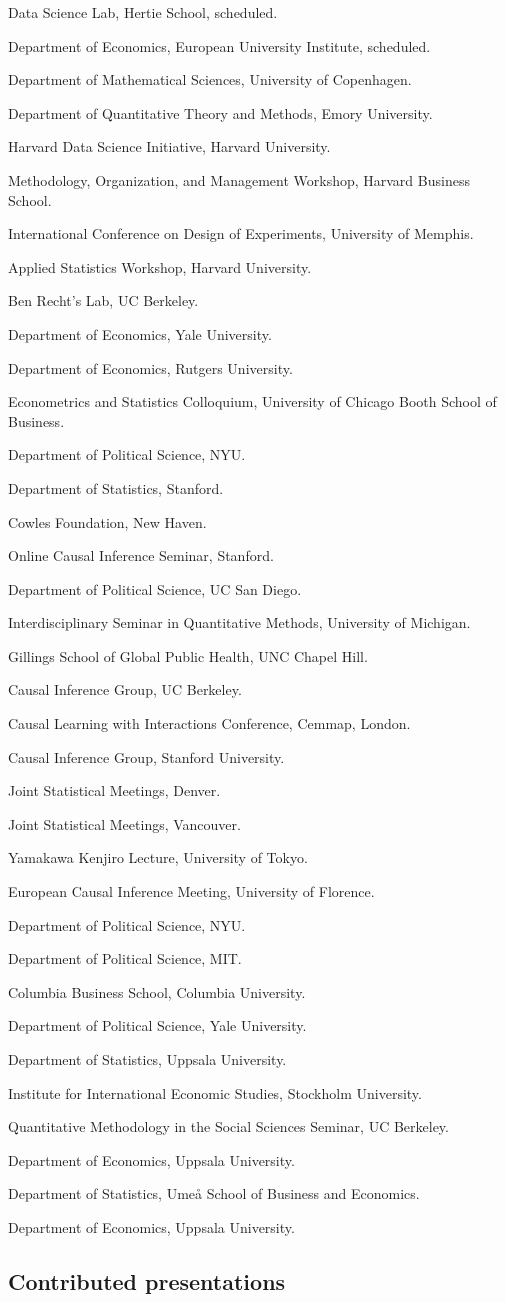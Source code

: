 \documentclass[10pt,letterpaper]{article}
\newenvironment{singledatelist}{
	\begin{list}{}{
		\setlength{\parskip}{0pt}
		\setlength{\itemsep}{4pt}
		\setlength{\parsep}{0.3em}
		\setlength{\leftmargin}{3.5em}
		\setlength{\labelwidth}{3.5em}
		\setlength{\labelsep}{1.5em}
		}
	}{
\end{list}
}
\newcommand{\dateitem}[2][]{\item[{#1}] {#2}}
\begin{document}
	\begin{singledatelist}
		\dateitem[2024]{Data Science Lab, Hertie School, scheduled.}
		\dateitem{Department of Economics, European University Institute, scheduled.}
		\dateitem{Department of Mathematical Sciences, University of Copenhagen.}
		\dateitem{Department of Quantitative Theory and Methods, Emory University.}
		\dateitem{Harvard Data Science Initiative, Harvard University.}
		\dateitem[2023]{Methodology, Organization, and Management Workshop, Harvard Business School.}
		\dateitem{International Conference on Design of Experiments, University of Memphis.}
		\dateitem{Applied Statistics Workshop, Harvard University.}
		\dateitem{Ben Recht's Lab, UC Berkeley.}
		\dateitem{Department of Economics, Yale University.}
		\dateitem[2021]{Department of Economics, Rutgers University.}
		\dateitem{Econometrics and Statistics Colloquium, University of Chicago Booth School of Business.}
		\dateitem{Department of Political Science, NYU.}
		\dateitem{Department of Statistics, Stanford.}
		\dateitem{Cowles Foundation, New Haven.}
		\dateitem{Online Causal Inference Seminar, Stanford.}
		\dateitem[2020]{Department of Political Science, UC San Diego.}
		\dateitem{Interdisciplinary Seminar in Quantitative Methods, University of Michigan.}
		\dateitem{Gillings School of Global Public Health, UNC Chapel Hill.}
		\dateitem{Causal Inference Group, UC Berkeley.}
		\dateitem[2019]{Causal Learning with Interactions Conference, Cemmap, London.}
		\dateitem{Causal Inference Group, Stanford University.}
		\dateitem{Joint Statistical Meetings, Denver.}
		\dateitem[2018]{Joint Statistical Meetings, Vancouver.}
		\dateitem{Yamakawa Kenjiro Lecture, University of Tokyo.}
		\dateitem{European Causal Inference Meeting, University of Florence.}
		\dateitem{Department of Political Science, NYU.}
		\dateitem{Department of Political Science, MIT.}
		\dateitem[2016]{Columbia Business School, Columbia University.}
		\dateitem[2015]{Department of Political Science, Yale University.}
		\dateitem{Department of Statistics, Uppsala University.}
		\dateitem{Institute for International Economic Studies, Stockholm University.}
		\dateitem[2014]{Quantitative Methodology in the Social Sciences Seminar, UC Berkeley.}
		\dateitem{Department of Economics, Uppsala University.}
		\dateitem[2013]{Department of Statistics, Umeå School of Business and Economics.}
		\dateitem[2012]{Department of Economics, Uppsala University.}
	\end{singledatelist}


	\subsection*{Contributed presentations}
\end{document}
